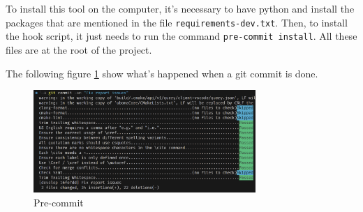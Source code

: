To install this tool on the computer, it's necessary to have python and install the packages that are mentioned in the file \texttt{requirements-dev.txt}.
Then, to install the hook script, it just needs to run the command \texttt{pre-commit install}.
All these files are at the root of the project.

The following figure \ref{fig:analysis:dev:pre-commit} show what's happened when a git commit is done.

\begin{figure}[ht]
  \centering
  \includegraphics[width=0.75\textwidth]{img/analyze_pre-commit.png}
  \caption{Pre-commit}
  \label{fig:analysis:dev:pre-commit}
\end{figure}


